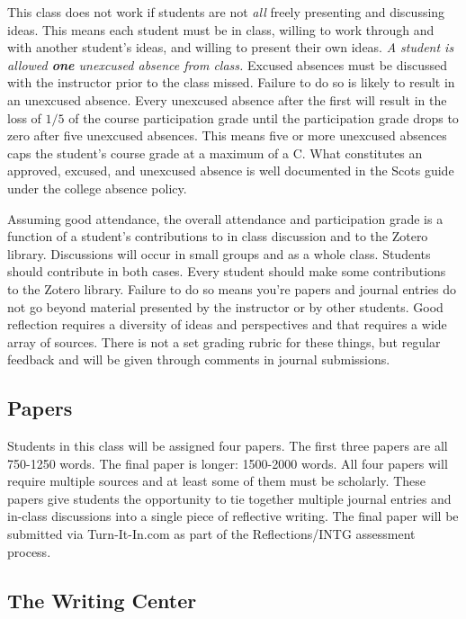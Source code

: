 \documentclass[]{tufte-handout}
\begin{document}
This class does not work if students are not \textit{all} freely presenting and discussing ideas.  This means each student must be in class, willing to work through and with another student's ideas, and willing to present their own ideas.  \textit{A student is allowed \textbf{one} unexcused absence from class.} Excused absences must be discussed with the instructor prior to the class missed.  Failure to do so is likely to result in an unexcused absence.  Every unexcused absence after the first will result in the loss of $1/5$ of the course participation grade until the participation grade drops to zero after five unexcused absences. This means five or more unexcused absences caps the student's course grade at a maximum of a C. What constitutes an approved, excused, and unexcused absence is well documented in the Scots guide under the college absence policy. 

Assuming good attendance, the overall attendance and participation grade is a function of a student's contributions to in class discussion and to the Zotero library.  Discussions will occur in small groups and as a whole class. Students should contribute in both cases. Every student should make some contributions to the Zotero library.  Failure to do so means you're papers and journal entries do not go beyond material presented by the instructor or by other students.  Good reflection requires a diversity of ideas and perspectives and that requires a wide array of sources. There is not a set grading rubric for these things, but regular feedback and will be given through comments in journal submissions. 

\subsection{Papers}

Students in this class will be  assigned four papers. The first three papers are all 750-1250 words. The final paper is longer: 1500-2000 words. All four papers will require multiple sources and at least some of them must be scholarly. These papers give students the opportunity to tie together multiple journal entries and in-class discussions into a single piece of reflective writing. The final paper will be submitted via Turn-It-In.com as part of the Reflections/INTG assessment process. 

\subsection{The Writing Center}
\end{document}
